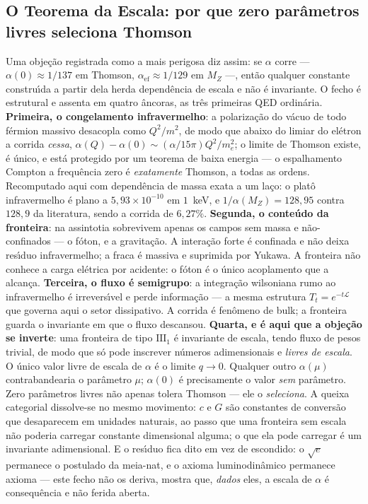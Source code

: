 \documentclass[11pt]{article}
\theoremstyle{definition}\newtheorem{deriv}{Derivação}
\begin{document}
\subsection*{O Teorema da Escala: por que zero par\^ametros livres seleciona Thomson}Uma obje\c{c}\~ao registrada como a mais perigosa diz assim: se $\alpha$ corre --- $\alpha(0)\approx 1/137$ em Thomson, $\alpha_{\mathrm{ef}}\approx 1/129$ em $M_Z$ ---, ent\~ao qualquer constante constru\'\i{}da a partir dela herda depend\^encia de escala e n\~ao \'e invariante. O fecho \'e estrutural e assenta em quatro \^ancoras, as tr\^es primeiras QED ordin\'aria. \textbf{Primeira, o congelamento infravermelho}: a polariza\c{c}\~ao do v\'acuo de todo f\'ermion massivo desacopla como $Q^2/m^2$, de modo que abaixo do limiar do el\'etron a corrida \emph{cessa}, $\alpha(Q)-\alpha(0)\sim(\alpha/15\pi)Q^2/m_e^2$; o limite de Thomson existe, \'e \'unico, e est\'a protegido por um teorema de baixa energia --- o espalhamento Compton a frequ\^encia zero \'e \emph{exatamente} Thomson, a todas as ordens. Recomputado aqui com depend\^encia de massa exata a um la\c{c}o: o plat\^o infravermelho \'e plano a $5{,}93\times10^{-10}$ em $1$~keV, e $1/\alpha(M_Z)=128{,}95$ contra $128{,}9$ da literatura, sendo a corrida de $6{,}27\%$. \textbf{Segunda, o conte\'udo da fronteira}: na assintotia sobrevivem apenas os campos sem massa e n\~ao-confinados --- o f\'oton, e a gravita\c{c}\~ao. A intera\c{c}\~ao forte \'e confinada e n\~ao deixa res\'\i{}duo infravermelho; a fraca \'e massiva e suprimida por Yukawa. A fronteira n\~ao conhece a carga el\'etrica por acidente: o f\'oton \'e o \'unico acoplamento que a alcan\c{c}a. \textbf{Terceira, o fluxo \'e semigrupo}: a integra\c{c}\~ao wilsoniana rumo ao infravermelho \'e irrevers\'\i{}vel e perde informa\c{c}\~ao --- a mesma estrutura $T_t=e^{-t\mathcal{L}}$ que governa aqui o setor dissipativo. A corrida \'e fen\^omeno de bulk; a fronteira guarda o invariante em que o fluxo descansou. \textbf{Quarta, e \'e aqui que a obje\c{c}\~ao se inverte}: uma fronteira de tipo $\mathrm{III}_1$ \'e invariante de escala, tendo fluxo de pesos trivial, de modo que s\'o pode inscrever n\'umeros adimensionais e \emph{livres de escala}. O \'unico valor livre de escala de $\alpha$ \'e o limite $q\to 0$. Qualquer outro $\alpha(\mu)$ contrabandearia o par\^ametro $\mu$; $\alpha(0)$ \'e precisamente o valor \emph{sem} par\^ametro. Zero par\^ametros livres n\~ao apenas tolera Thomson --- ele o \emph{seleciona}. A queixa categorial dissolve-se no mesmo movimento: $c$ e $G$ s\~ao constantes de convers\~ao que desaparecem em unidades naturais, ao passo que uma fronteira sem escala n\~ao poderia carregar constante dimensional alguma; o que ela pode carregar \'e um invariante adimensional. E o res\'\i{}duo fica dito em vez de escondido: o $\sqrt{e}$ permanece o postulado da meia-nat, e o axioma luminodin\^amico permanece axioma --- este fecho n\~ao os deriva, mostra que, \emph{dados} eles, a escala de $\alpha$ \'e consequ\^encia e n\~ao ferida aberta.
\end{document}
